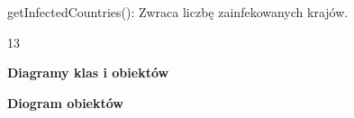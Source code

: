 \documentclass[a4paper]{article}
\begin{document}
\foreignlanguage{polish}{getInfectedCountries(): Zwraca liczbę zainfekowanych krajów.}
\bigskip
\bigskip
\bigskip
\bigskip
\bigskip
\bigskip
\bigskip
\bigskip
\bigskip
\bigskip
\bigskip
\bigskip
\bigskip
\bigskip
\bigskip
\bigskip
\bigskip
\bigskip
\bigskip
\bigskip
\bigskip
\bigskip
\bigskip
\bigskip
\bigskip
\bigskip
\bigskip
\bigskip
\bigskip
\bigskip
\bigskip
\bigskip
\bigskip
\bigskip
\bigskip
\bigskip
\bigskip
\bigskip
\bigskip
\bigskip
\bigskip
\bigskip
\bigskip
\bigskip
\bigskip
\bigskip
\bigskip
\bigskip
\bigskip
\bigskip
\bigskip
\bigskip
\bigskip
\bigskip
\bigskip
\bigskip
\bigskip
\bigskip
\bigskip
\bigskip
\bigskip
\bigskip
\bigskip
\bigskip
\begin{center}
	13
\end{center}
\newpage
\newpage
{\centering
\foreignlanguage{polish}{\textbf{Diagramy klas i obiektów}}
\par}
\vspace{24pt}
{\centering
\foreignlanguage{polish}{\textbf{Diogram obiektów}}
\par}
\vspace{6pt}

\end{document}

